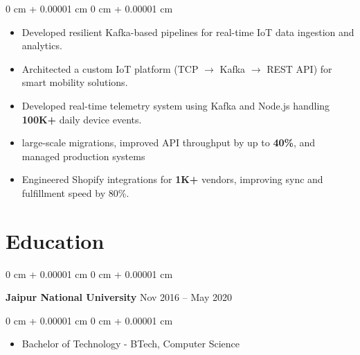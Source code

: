 \documentclass[10pt, letterpaper]{article}
\newenvironment{highlights}{
    \begin{itemize}[
        topsep=0.10 cm,
        parsep=0.10 cm,
        partopsep=0pt,
        itemsep=0pt,
        leftmargin=0 cm + 10pt
    ]
}{
    \end{itemize}
} %
\newenvironment{onecolentry}{
    \begin{adjustwidth}{
        0 cm + 0.00001 cm
    }{
        0 cm + 0.00001 cm
    }
}{
    \end{adjustwidth}
} %
\newenvironment{twocolentry}[2][]{
    \onecolentry
    \def\secondColumn{#2}
    \setcolumnwidth{\fill, 4.5 cm}
    \begin{paracol}{2}
}{
    \switchcolumn \raggedleft \secondColumn
    \end{paracol}
    \endonecolentry
} %
\begin{document}
        \vspace{0.10 cm}
        \begin{onecolentry}
            \begin{highlights}
                \item Developed resilient Kafka-based pipelines for real-time IoT data ingestion and analytics.
                \item Architected a custom IoT platform (TCP $\rightarrow$ Kafka $\rightarrow$ REST API) for smart mobility solutions.
                \item Developed real-time telemetry system using Kafka and Node.js handling \textbf{100K+} daily device events.
                \item large-scale migrations, improved API throughput by up to \textbf{40\%}, and managed production systems 
                \item Engineered Shopify integrations for \textbf{1K+} vendors, improving sync and fulfillment speed by 80\%.
            \end{highlights}
        \end{onecolentry}



    
 \section{Education}



        
        \begin{twocolentry}{
            Nov 2016 – May 2020
        }
            \textbf{Jaipur National University}\end{twocolentry}

        \vspace{0.10 cm}
        \begin{onecolentry}
            \begin{highlights}
                \item Bachelor of Technology - BTech, Computer Science
            \end{highlights}
        \end{onecolentry}
\end{document}

